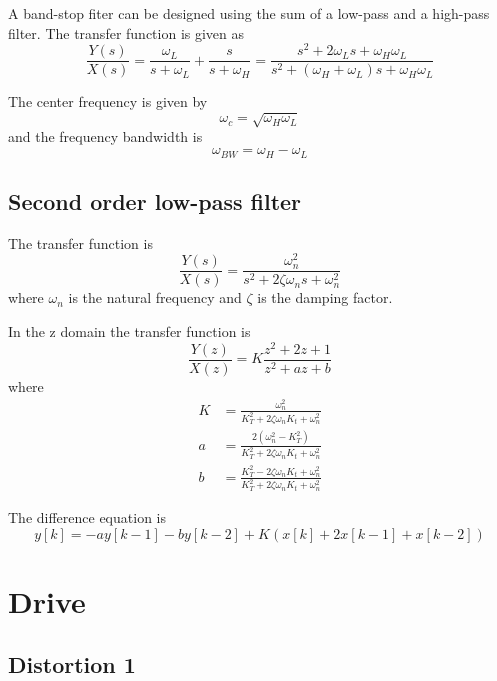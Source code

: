 \documentclass[11pt]{article}
\begin{document}
A band-stop fiter can be designed using the sum of a low-pass and a high-pass filter. The transfer function is given as
\begin{equation}
	\frac{Y(s)}{X(s)} = \frac{\omega_L}{s + \omega_L} + \frac{s}{s + \omega_H} = \frac{s^2 + 2\omega_Ls + \omega_H\omega_L}{s^2 + (\omega_H + \omega_L)s + \omega_H\omega_L}
\end{equation}

The center frequency is given by
\begin{equation}
	\omega_c = \sqrt{\omega_H\omega_L}
\end{equation}
and the frequency bandwidth is
\begin{equation}
	\omega_{BW} = \omega_H - \omega_L
\end{equation}


\subsection{Second order low-pass filter}

The transfer function is
\begin{equation}
	\frac{Y(s)}{X(s)} = \frac{\omega_n^2}{s^2 + 2\zeta\omega_n s + \omega_n^2}
\end{equation}
where $\omega_n$ is the natural frequency and $\zeta$ is the damping factor.

In the z domain the transfer function is
\begin{equation}
	\frac{Y(z)}{X(z)} = K \frac{z^2 + 2z + 1} {z^2 + a z + b}
\end{equation}
where
\begin{align}
	K &= \frac{\omega_n^2}{K_T^2 + 2\zeta\omega_nK_t+\omega_n^2}\\
	a &= \frac{2(\omega_n^2 - K_T^2)} {K_T^2 + 2\zeta\omega_nK_t+\omega_n^2} \\
	b &= \frac{K_T^2 - 2\zeta\omega_nK_t+\omega_n^2} {K_T^2 + 2\zeta\omega_nK_t+\omega_n^2} 
\end{align}

The difference equation is
\begin{equation}
	y[k] = -ay[k-1] - by[k-2] + K \left( x[k] + 2x[k-1] + x[k-2] \right)
\end{equation}


\section{Drive}

\subsection{Distortion 1}
\end{document}
